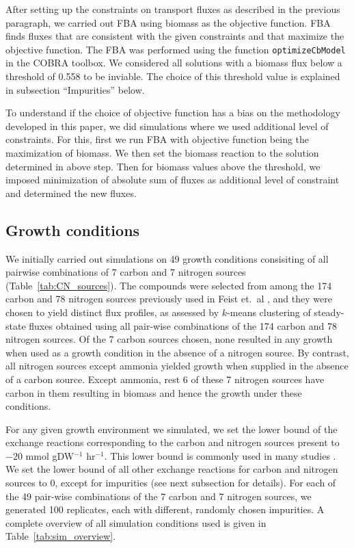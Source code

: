 \documentclass[12pt]{article}
\begin{document}
After setting up the constraints on transport fluxes as described in the previous paragraph, we carried out FBA using biomass as the objective function. FBA finds fluxes that are consistent with the given constraints and that maximize the objective function. The FBA was performed using the function \texttt{optimizeCbModel} in the COBRA toolbox. We considered all solutions with a biomass flux below a threshold of 0.558 to be inviable. The choice of this threshold value is explained in subsection ``Impurities'' below.

To understand if the choice of objective function has a bias on the methodology developed in this paper, we did simulations where we used additional level of constraints. For this, first we run FBA with objective function being the maximization of biomass. We then set the biomass reaction to the solution determined in above step. Then for biomass values above the threshold, we imposed minimization of absolute sum of fluxes as additional level of constraint and determined the new fluxes.

\subsection{Growth conditions} 
We initially carried out simulations on 49 growth conditions consisiting of all pairwise combinations of 7 carbon and 7 nitrogen sources (Table~\ref{tab:CN_sources}). The compounds were selected from among the 174 carbon and 78 nitrogen sources previously used in Feist et.\ al \cite{Feistetal2007}, and they were chosen to yield distinct flux profiles, as assessed by $k$-means clustering of steady-state fluxes obtained using all pair-wise combinations of the 174 carbon and 78 nitrogen sources. Of the 7 carbon sources chosen, none resulted in any growth when used as a growth condition in the absence of a nitrogen source. By contrast, all nitrogen sources except ammonia yielded growth when supplied in the absence of a carbon source. Except ammonia, rest 6 of these 7 nitrogen sources have carbon in them resulting in biomass and hence the growth under these conditions.

For any given growth environment we simulated, we set the lower bound of the exchange reactions corresponding to the carbon and nitrogen sources present to $-20$ mmol gDW$^{-1}$ hr$^{-1}$. This lower bound is commonly used in many studies \cite{Feistetal2007}. We set the lower bound of all other exchange reactions for carbon and nitrogen sources to 0, except for impurities (see next subsection for details). For each of the 49 pair-wise combinations of the 7 carbon and 7 nitrogen sources, we generated 100 replicates, each with different, randomly chosen impurities. A complete overview of all simulation conditions used is given in Table~\ref{tab:sim_overview}.
\end{document}
